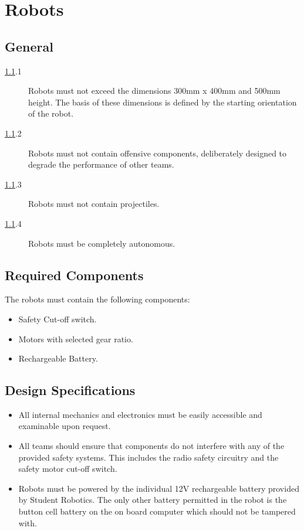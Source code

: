 \section {Robots}
\label{robots}

\subsection {General}
\label{genrob}

\begin {description}
\item [\ref{genrob}.1] Robots must not exceed the dimensions 300mm x 400mm and 500mm height. The basis of these dimensions is defined by the starting orientation of the robot.
\item [\ref{genrob}.2] Robots must not contain offensive components, deliberately designed to degrade the performance of other teams.
\item [\ref{genrob}.3] Robots must not contain projectiles.
\item [\ref{genrob}.4] Robots must be completely autonomous.
\end {description}


\subsection {Required Components}

The robots must contain the following components:

\begin {itemize}
\item {Safety Cut-off switch.}
\item {Motors with selected gear ratio.}
\item {Rechargeable Battery.}
\end {itemize}

\subsection {Design Specifications}
\label {design}

\begin {itemize}
\item [\ref{design}.1] All internal mechanics and electronics must be easily accessible and examinable upon request.
\item [\ref{design}.2] All teams should ensure that components do not interfere with any of the provided safety systems. This includes the radio safety circuitry and the safety motor cut-off switch.
\item [\ref{design}.3] Robots must be powered by the individual 12V rechargeable battery provided by Student Robotics. The only other battery permitted in the robot is the button cell battery on the on board computer which should not be tampered with.
\end {itemize}

